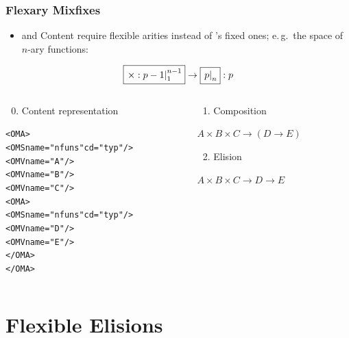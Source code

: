 \documentclass[pdftex,xcolor=svgnames]{beamer}
\newcommand{\ExprColor}[1]{\textcolor[RGB]{38,134,102}{#1}}%
\def\imarg#1#2{\fbox{\ensuremath{\left.#1\right|_{#2}}}}
\def\fimarg#1#2#3{\fbox{\ensuremath{\left.#1\right|_{#2}^{#3}}}}
\def\recu#1{#1}%
\begin{document}
\begin{frame}[fragile]
  \frametitle{Flexary Mixfixes}
  \begin{itemize}
  \item {\openmath} and Content {\mathml} require \ExprColor{flexible arities}
    instead of {\isabelle}'s fixed ones; e.\,g.\ the space of $n$-ary functions:
  \end{itemize}
  \[\fimarg{\times:\recu{p-1}}{1}{n-1}\to\imarg{\recu{p}}{n}:p\]
  \begin{columns}[T]
    \begin{column}{.5\textwidth}
      {\scriptsize\begin{enumerate}
        \setcounter{enumi}{-1}
      \item Content representation
      \end{enumerate}}
      {\scriptsize
\begin{alltt}
<OMA>
  <OMS name="nfuns" cd="typ"/>
  <OMV name="A"/>
  <OMV name="B"/>
  <OMV name="C"/>
  <OMA>
    <OMS name="nfuns" cd="typ"/>
    <OMV name="D"/>
    <OMV name="E"/>
  </OMA>
</OMA>              
\end{alltt}}
    \end{column}
    \begin{column}{.5\textwidth}
      {\scriptsize\begin{enumerate}
      \item Composition
      \end{enumerate}}
      $A\times B\times C\to(D\to E)$
      \\[2ex]
      {\scriptsize\begin{enumerate}
        \setcounter{enumi}{1}
      \item Elision
      \end{enumerate}}
      $A\times B\times C\to D\to E$
    \end{column}
  \end{columns}
\end{frame}

\section{Flexible Elisions}
\label{sec:elisions}
\end{document}

